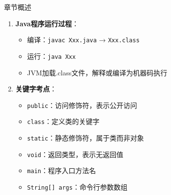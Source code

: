 \documentclass[12pt, a4paper]{ctexart}
\begin{document}
\begin{enumerate}[label=\textbf{\arabic*.}]
\begin{bluebox}{章节概述}
\begin{enumerate}[label={}, leftmargin=*, nosep]
			      \item \textbf{Java程序运行过程}：
			            \begin{itemize}
				            \item 编译：\texttt{javac Xxx.java} → \texttt{Xxx.class}
				            \item 运行：\texttt{java Xxx}
				            \item JVM加载.class文件，解释或编译为机器码执行
			            \end{itemize}

			      \item \textbf{关键字考点}：
			            \begin{itemize}
				            \item \texttt{public}：访问修饰符，表示公开访问
				            \item \texttt{class}：定义类的关键字
				            \item \texttt{static}：静态修饰符，属于类而非对象
				            \item \texttt{void}：返回类型，表示无返回值
				            \item \texttt{main}：程序入口方法名
				            \item \texttt{String[] args}：命令行参数数组
			            \end{itemize}
		      \end{enumerate}
	      \end{bluebox}

\end{enumerate}
\end{document}

